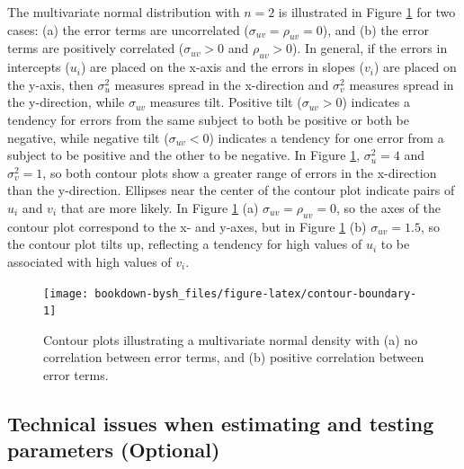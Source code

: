 \documentclass[
]{krantz}
\begin{document}
The multivariate normal distribution with \(n=2\) is illustrated in Figure \ref{fig:contour-boundary} for two cases: (a) the error terms are uncorrelated (\(\sigma_{uv}=\rho_{uv}=0\)), and (b) the error terms are positively correlated (\(\sigma_{uv}>0\) and \(\rho_{uv} > 0\)). In general, if the errors in intercepts (\(u_{i}\)) are placed on the x-axis and the errors in slopes (\(v_{i}\)) are placed on the y-axis, then \(\sigma_{u}^{2}\) measures spread in the x-direction and \(\sigma_{v}^{2}\) measures spread in the y-direction, while \(\sigma_{uv}\) measures tilt. Positive tilt (\(\sigma_{uv}>0\)) indicates a tendency for errors from the same subject to both be positive or both be negative, while negative tilt (\(\sigma_{uv}<0\)) indicates a tendency for one error from a subject to be positive and the other to be negative. In Figure \ref{fig:contour-boundary}, \(\sigma_{u}^{2}=4\) and \(\sigma_{v}^{2}=1\), so both contour plots show a greater range of errors in the x-direction than the y-direction. Ellipses near the center of the contour plot indicate pairs of \(u_{i}\) and \(v_{i}\) that are more likely. In Figure \ref{fig:contour-boundary} (a) \(\sigma_{uv}=\rho_{uv}=0\), so the axes of the contour plot correspond to the x- and y-axes, but in Figure \ref{fig:contour-boundary} (b) \(\sigma_{uv}=1.5\), so the contour plot tilts up, reflecting a tendency for high values of \(u_{i}\) to be associated with high values of \(v_{i}\).

\begin{figure}

{\centering \texttt{[image: bookdown-bysh\_files/figure-latex/contour-boundary-1]} 

}

\caption{Contour plots illustrating a multivariate normal density with (a) no correlation between error terms, and (b) positive correlation between error terms.}\label{fig:contour-boundary}
\end{figure}

\hypertarget{multileveltechnical}{%
\subsection{Technical issues when estimating and testing parameters (Optional)}\label{multileveltechnical}}
\end{document}
